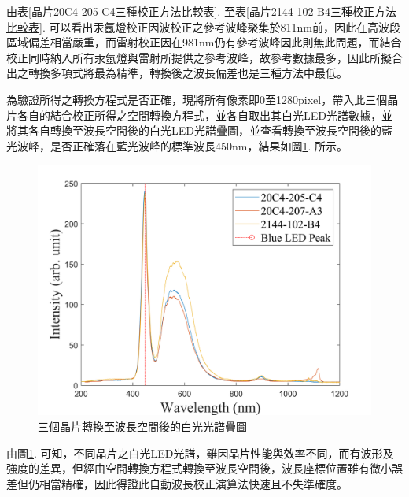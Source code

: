 由表\ref{晶片20C4-205-C4三種校正方法比較表}. 至表\ref{晶片2144-102-B4三種校正方法比較表}. 可以看出汞氬燈校正因波校正之參考波峰聚集於811nm前，因此在高波段區域偏差相當嚴重，而雷射校正因在981nm仍有參考波峰因此則無此問題，而結合校正同時納入所有汞氬燈與雷射所提供之參考波峰，故參考數據最多，因此所擬合出之轉換多項式將最為精準，轉換後之波長偏差也是三種方法中最低。
\par
為驗證所得之轉換方程式是否正確，現將所有像素即0至1280pixel，帶入此三個晶片各自的結合校正所得之空間轉換方程式，並各自取出其白光LED光譜數據，並將其各自轉換至波長空間後的白光LED光譜疊圖，並查看轉換至波長空間後的藍光波峰，是否正確落在藍光波峰的標準波長450nm，結果如圖\ref{三個晶片轉換至波長空間後的白光光譜疊圖}. 所示。
\begin{figure}[H] %
	\centering %
	\vspace{0.8cm}
	\includegraphics[width=15cm]{figures/Result/白光結果疊圖.png} %
	\caption{三個晶片轉換至波長空間後的白光光譜疊圖} %
	\label{三個晶片轉換至波長空間後的白光光譜疊圖} %
\end{figure}
由圖\ref{三個晶片轉換至波長空間後的白光光譜疊圖}. 可知，不同晶片之白光LED光譜，雖因晶片性能與效率不同，而有波形及強度的差異，但經由空間轉換方程式轉換至波長空間後，波長座標位置雖有微小誤差但仍相當精確，因此得證此自動波長校正演算法快速且不失準確度。